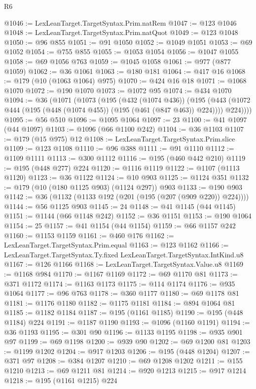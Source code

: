 \begin{lexlean}{R6}
\begin{coremodule}
@1046 := LexLeanTarget.TargetSyntax.Prim.natRem
@1047 := @123 @1046
@1048 := LexLeanTarget.TargetSyntax.Prim.natQuot
@1049 := @123 @1048
@1050 := @96 @855
@1051 := @91 @1050
@1052 := @1049 @1051
@1053 := @69 @1052
@1054 := @755 @855
@1055 := @1053 @1054
@1056 := @1047 @1055
@1058 := @69 @1056 @763
@1059 := @1045 @1058
@1061 := @977 (@877 @1059)
@1062 := @36 @1061
@1063 := @180 @181
@1064 := @417 @16
@1068 := @179 (@10 (@1063 @1064) @975)
@1070 := @424 @16 @18
@1071 := @1068 @1070
@1072 := @190 @1070
@1073 := @1072 @95
@1074 := @434 @1070
@1094 := @36
    (@1071
      (@1073
        (@195
          (@432 (@1074 @436))
          (@195
            (@443 (@1072 @444 (@195 (@448 (@1074 @455)) (@195 (@461 (@847 @463)) @224))))
            @224))))
@1095 := @56 @510
@1096 := @1095 @1064
@1097 := 23
@1100 := @41 @1097 (@44 @1097)
@1103 := @1096 (@66 @1100 @242)
@1104 := @36 @1103
@1107 := @179 (@15 @975) @12
@1108 := LexLeanTarget.TargetSyntax.Prim.slice
@1109 := @123 @1108
@1110 := @96 @388
@1111 := @91 @1110
@1112 := @1109 @1111
@1113 := @300 @1112
@1116 := @195 (@460 @442 @210)
@1119 := @195 (@448 @277) @224
@1120 := @1116 @1119
@1122 := @1107 (@1113 @1120)
@1123 := @36 @1122
@1124 := @10 @903
@1125 := @1124 @351
@1132 := @179 (@10 (@180 @1125 @903) (@1124 @297)) @903
@1133 := @190 @903
@1142 := @36 (@1132 (@1133 @192 (@201 (@195 (@207 (@909 @220)) @224))))
@1144 := @56 @1125 @903
@1145 := 24
@1148 := @41 @1145 (@44 @1145)
@1151 := @1144 (@66 @1148 @242)
@1152 := @36 @1151
@1153 := @190 @1064
@1154 := 25
@1157 := @41 @1154 (@44 @1154)
@1159 := @66 @1157 @242
@1160 := @1153 @1159
@1161 := @460 @176
@1162 := LexLeanTarget.TargetSyntax.Prim.equal
@1163 := @123 @1162
@1166 := LexLeanTarget.TargetSyntax.Ty.fixed LexLeanTarget.TargetSyntax.IntKind.u8
@1167 := @126 @1166
@1168 := LexLeanTarget.TargetSyntax.Value.u8
@1169 := @1168 @984
@1170 := @1167 @1169
@1172 := @69 @1170 @81
@1173 := @371 @1172
@1174 := @1163 @1173
@1175 := @114 @1174
@1176 := @935 @1064
@1177 := @96 @763
@1178 := @360 @1177
@1180 := @69 @1178 @81
@1181 := @1176 @1180
@1182 := @1175 @1181
@1184 := @894 @1064 @81
@1185 := @1182 @1184
@1187 := @195 (@1161 @1185)
@1190 := @195 (@448 @1184) @224
@1191 := @1187 @1190
@1193 := @1096 (@1160 @1191)
@1194 := @36 @1193
@1195 := @301 @90
@1196 := @1133 @1195
@1198 := @935 @901 @97
@1199 := @69 @1198
@1200 := @939 @90
@1202 := @69 @1200 @81
@1203 := @1199 @1202
@1204 := @917 @1203
@1206 := @195 (@448 @1204)
@1207 := @371 @97
@1208 := @384 @1207
@1210 := @69 @1208 @1202
@1211 := @155 @1210
@1213 := @69 @1211 @81
@1214 := @920 @1213
@1215 := @917 @1214
@1218 := @195 (@1161 @1215) @224

\end{coremodule}
\end{lexlean}
